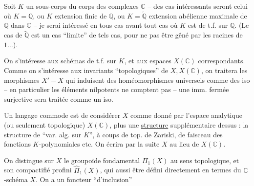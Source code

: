 Soit $K$ un sous-corps du corps des complexes $\mathbb C$ -- des cas intéressants seront celui où $K=\mathbb Q$, ou $K$ extension finie de $\mathbb Q$, ou $K=\widetilde{\mathbb Q}$ extension abélienne maximale de $\mathbb Q$ dans $\mathbb C$ -- je serai intéressé en tous cas avant tout  cas où $K$ est de t.f. sur $\mathbb Q$. (Le cas de $\widetilde{\mathbb Q}$ est un cas ``limite'' de tels cas, pour ne pas être gêné par les racines de $1\ldots$).

On s'intéresse aux schémas  de t.f. sur $K$, et aux espaces  $X(\mathbb C)$ correspondants. Comme on s'intéresse aux invariants ``topologiques'' de $X,X(\mathbb C)$, on traitera les morphismes $X'-X$ qui induisent des homéomorphismes universels comme des iso -- en particulier les éléments nilpotents ne comptent pas -- une imm. fermée surjective sera traitée comme un iso.

Un langage commode est de considérer $X$ comme donné par l'espace analytique (ou  seulement topologique) $X(\mathbb C)$, plus une \uline{structure} supplémentaire dessus : la structure de ``var. alg. sur $K$'', à coups de top. de Zariski, de faisceau des fonctions $K$-polynomiales etc. On écrira par la suite $X$ au lieu de $X(\mathbb C)$.

On distingue sur $X$ le groupoïde fondamental $\Pi_1(X)$ au sens topologique, et son compactifié profini $\widehat\Pi_1(X)$, qui   aussi être défini directement en termes du $\mathbb C$-schéma $X$. On a un foncteur ``d'inclusion''
